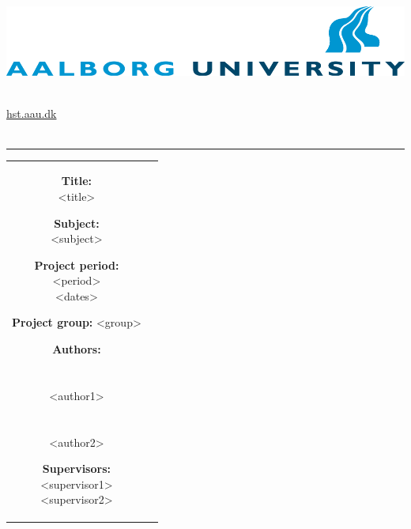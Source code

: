 	\begin{adjustwidth*}{-1.6cm}{-1cm}
		\begin{nopagebreak}
			{\samepage 
				\parbox{14.5cm}{
					\begin{flushright}
						\includegraphics{img/aauLogoEn.png}\\
					\end{flushright}
					\vspace{0.2cm}
				  \\
				  { \href{http://hst.aau.dk/}{hst.aau.dk}}\\
				  \vspace{-0.8cm}\\
					\hrule
					\vspace{0.2cm}
				}
				
				\begin{tabular}{cc}
					\parbox{6.3cm}{
						\hspace{2cm}
						\begin{description}
							\item {\textbf{Title:}}\\
								<title>
							\item {\textbf{Subject:}}\\
								<subject>\\
							\item {\textbf{Project period:}}\\
							  <period>\\
							  <dates>\\
							\item {\textbf{Project group:}}
							  <group>
							\item {\textbf{Authors:}}\\\\
								\underline{\phantom{-----------------------------------------}}\\
								<author1>\\\\
								\underline{\phantom{-----------------------------------------}}\\
								<author2>\\
							\item {\textbf{Supervisors:}}\\
								<supervisor1>\\
								<supervisor2>\\
						\end{description}
						
}
\end{tabular}}
\end{nopagebreak}
\end{adjustwidth*}
